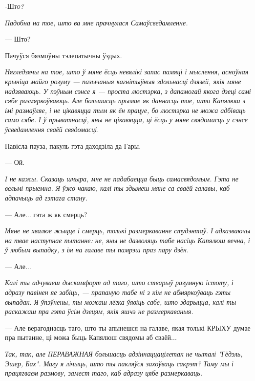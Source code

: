

\lettrine[lines=1,lraise=-0.1]{-Ш}{\emph{то?}}

\emph{Падобна на тое, што ва мне прачнулася Самаўсведамленне.}

--- Што?

Пачуўся бязмоўны тэлепатычны ўздых.

\emph{Нягледзячы на тое, што ў мяне ёсць невялікі запас памяці і мыслення,
асноўная крыніца майго розуму --- пазычаныя кагнітыўныя здольнасці дзязей, якія
мяне надзяваюць. У пэўным сэнсе я --- проста люстэрка, з дапамогай якога 
дзеці \emph{самі} сябе размяркоўваюць. Але большасць прымае як даннасць тое, 
што Капялюш з імі размаўляе, і не цікавяцца тым як ён працуе, бо люстэрка не можа
адбіваць само сябе. І ў прыватнасці, яны не цікавяцца, ці ёсць у мяне свядомасць 
у сэнсе ўсведамлення сваёй свядомасці.}

Павісла пауза, пакуль гэта даходзіла да Гары.

--- Ой.

\emph{І не кажы. Сказаць шчыра, мне не падабаецца быць самасвядомым. Гэта не 
вельмі прыемна. Я ўжо чакаю, калі ты здымеш мяне са сваёй галавы, каб адпачыць 
ад гэтага стану.}

--- Але...  гэта ж як смерць?

\emph{Мяне не хвалюе жыцце і смерць, толькі размеркаванне студэнтаў.
І адказваючы на твае наступнае пытанне: не, яны не дазволяць табе насіць Капялюш
вечна, і ў любым выпадку, з ім на галаве ты памрэш праз пару дзён.}

--- Але...

\emph{Калі ты адчуваеш дыскамфорт ад таго, што стварыў разумную істоту, і адразу
павінен яе забіць, --- прапаную табе ні з кім не абмяркоўваць гэты выпадак.
Я ўпэўнены, ты можаш лёгка ўявіць сабе, што здарыцца, калі ты раскажаш пра гэта
ўсім дзецям, якія яшчэ не размеркаваныя.}

--- Але верагоднасць таго, што ты апынешся на галаве, якая толькі 
КРЫХУ думае пра пытанне, ці можа быць Капялюш свядомы аб сваёй...

\emph{Так, так, але ПЕРАВАЖНАЯ большасць адзіннаццацілетак не чыталі 
"Гёдэль, Эшер, Бах". Магу я лічыць, што ты пакляўся захоўваць сакрэт?
Таму мы і працягваем размову, замест таго, каб адразу цябе размеркаваць.}

